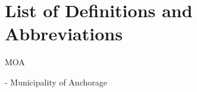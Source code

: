 
\newpage
\setcounter{secnumdepth}{0}
\section{List of Definitions and Abbreviations}
\begin{itemize*}
  \item{\begin{bf}MOA\end{bf}} - Municipality of Anchorage

\end{itemize*}
